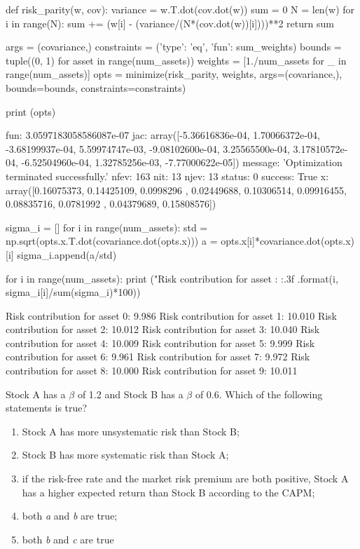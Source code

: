 \cprotEnv \begin{solution}
\begin{ipython}
def risk_parity(w, cov):
    variance = w.T.dot(cov.dot(w))
    sum = 0 
    N = len(w)
    for i in range(N):
        sum += (w[i] - (variance/(N*(cov.dot(w))[i])))**2
    return sum

args = (covariance,)
constraints = ({'type': 'eq', 'fun': sum_weights})
bounds = tuple((0, 1) for asset in range(num_assets))
weights = [1./num_assets for _ in range(num_assets)]
opts = minimize(risk_parity, weights, args=(covariance,),
                bounds=bounds, constraints=constraints)

print (opts)
\end{ipython}
\begin{ioutput}
    fun: 3.0597183058586087e-07
    jac: array([-5.36616836e-04,  1.70066372e-04, -3.68199937e-04, 
                 5.59974747e-03, -9.08102600e-04,  3.25565500e-04,  
                 3.17810572e-04, -6.52504960e-04,  1.32785256e-03, 
                -7.77000622e-05])
message: 'Optimization terminated successfully.'
   nfev: 163
    nit: 13
   njev: 13
 status: 0
success: True
      x: array([0.16075373, 0.14425109, 0.0998296 , 0.02449688, 0.10306514,
                0.09916455, 0.08835716, 0.0781992 , 0.04379689, 0.15808576])
\end{ioutput}
\begin{ipython}
sigma_i = []
for i in range(num_assets):
    std = np.sqrt(opts.x.T.dot(covariance.dot(opts.x)))
    a = opts.x[i]*covariance.dot(opts.x)[i]
    sigma_i.append(a/std)

for i in range(num_assets):
    print ("Risk contribution for asset {}: {:.3f}%
           .format(i, sigma_i[i]/sum(sigma_i)*100))
\end{ipython}
\begin{ioutput}
Risk contribution for asset 0: 9.986%
Risk contribution for asset 1: 10.010%
Risk contribution for asset 2: 10.012%
Risk contribution for asset 3: 10.040%
Risk contribution for asset 4: 10.009%
Risk contribution for asset 5: 9.999%
Risk contribution for asset 6: 9.961%
Risk contribution for asset 7: 9.972%
Risk contribution for asset 8: 10.000%
Risk contribution for asset 9: 10.011%
\end{ioutput}
\end{solution}

\begin{question}
Stock A has a $\beta$ of 1.2 and Stock B has a $\beta$ of 0.6. Which of the following statements is true? 
\begin{enumerate}[label=\emph{\alph*})]
\item Stock A has more unsystematic risk than Stock B;
\item Stock B has more systematic risk than Stock A; 
\item if the risk-free rate and the market risk premium are both positive, Stock A has a higher expected return than Stock B according to the CAPM;
\item both \emph{a} and \emph{b} are true;
\item both \emph{b} and \emph{c} are true
\end{enumerate}
\end{question}

